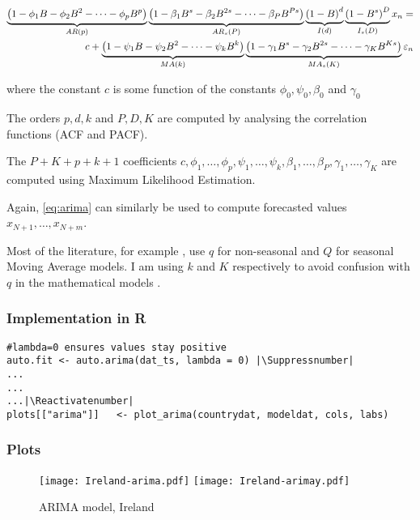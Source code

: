 \begin{align}\label{eq:arima}
\underbrace{\left(1-\phi_1 B-\phi_2B^2-\dots-\phi_p B^p\right)}_{AR(p)}
\underbrace{\left(1-\beta_1 B^s-\beta_2B^{2s}-\dots-\beta_P B^{Ps}\right)}_{AR_s(P)} 
\underbrace{\left(1-B\right)^d}_{I(d)}\underbrace{\left(1-B^s\right)^D}_{I_s(D)}   x_n = \nonumber \\
 c+
\underbrace{\left(1-\psi_1 B-\psi_2B^2-\dots-\psi_k B^k\right)}_{MA(k)}
\underbrace{\left(1-\gamma_1 B^s-\gamma_2B^{2s}-\dots-\gamma_K B^{Ks}\right)}_{MA_s(K)} \varepsilon_n
\end{align}

where the constant $c$ is some function of the constants $\phi_0,\psi_0,\beta_0$ and $\gamma_0$ 

The orders $p, d, k$ and $P,D,K$ are computed by analysing the correlation functions (ACF and PACF).

The $P+K+p + k + 1$ coefficients $c, \phi_1, \dots , \phi_p, \psi_1,\dots , \psi_k, \beta_1,\dots,\beta_P,\gamma_1,\dots,\gamma_K$ are computed using Maximum Likelihood Estimation.

Again, \eqref{eq:arima} can similarly be used to compute forecasted values $x_{N+1},\dots,x_{N+m}$.

\begin{nremark}
Most of the literature, for example  \cite{Hyndman-et-al-2018}, use $q$ for non-seasonal and $Q$ for seasonal Moving Average models. I am using $k$ and $K$ respectively to avoid confusion with $q$ in the mathematical models \label{eq:xnrecurr}.
\end{nremark}

\subsubsection{Implementation in R}

\begin{lstlisting}[breaklines = true, escapeinside=||, tabsize = 4, caption = {Algorithm for ARIMA Model}]
#lambda=0 ensures values stay positive
auto.fit <- auto.arima(dat_ts, lambda = 0) |\Suppressnumber|
...
...
...|\Reactivatenumber|
plots[["arima"]]   <- plot_arima(countrydat, modeldat, cols, labs)
\end{lstlisting}

\subsubsection{Plots}

\begin{figure}[H]
  \texttt{[image: Ireland-arima.pdf]} \label{fig:ireland-arima}
\endminipage\hfill
{}
  \texttt{[image: Ireland-arimay.pdf]} \label{fig:ireland-arimay}
\endminipage
\caption{ARIMA model, Ireland}
\end{figure}

